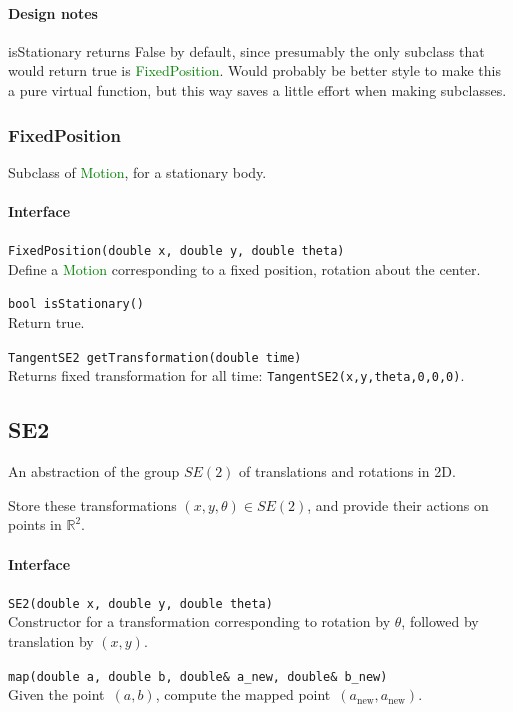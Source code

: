 \documentclass[11pt]{article}
\def\class#1{\textcolor{green}{\ttfamily\small #1}} %
\def\fn#1{{\ttfamily\small #1}} %
\let\code\lstinline
\begin{document}
\paragraph{Design notes}
\fn{isStationary} returns False by default, since presumably the only subclass that would return true is \class{FixedPosition}.  Would probably be better style to make this a pure virtual function, but this way saves a little effort when making subclasses.

\subsubsection{FixedPosition}
Subclass of \class{Motion}, for a stationary body.

\paragraph{Interface}
\begin{description}
	\item \code|FixedPosition(double x, double y, double theta)| \\
		Define a \class{Motion} corresponding to a fixed position, rotation about the center.
	\item \code|bool isStationary()|\\
		Return true.
	\item \code|TangentSE2 getTransformation(double time)|\\
		Returns fixed transformation for all time: \code|TangentSE2(x,y,theta,0,0,0)|.
\end{description}


\subsection{SE2}
An abstraction of the group $SE(2)$ of translations and rotations in 2D.

Store these transformations $(x,y,\theta)\in SE(2)$, and provide their actions on points in $\mathbb{R}^2$.

\paragraph{Interface}
\begin{description}
	\item \code|SE2(double x, double y, double theta)|\\
		Constructor for a transformation corresponding to rotation by $\theta$, followed by translation by $(x,y)$.
	\item \code|map(double a, double b, double& a_new, double& b_new)|\\
		Given the point~$(a,b)$, compute the mapped point~$(a_\text{new},a_\text{new})$.
\end{description}
\end{document}
